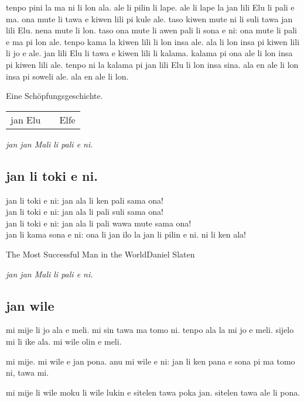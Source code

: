 tenpo pini la ma ni li lon ala. 
ale li pilin li lape. 
ale li lape la jan lili Elu li pali e ma. 
ona mute li tawa e kiwen lili pi kule ale. 
taso kiwen mute ni li suli tawa jan lili Elu. 
nena mute li lon.  
taso ona mute li awen pali li sona e ni: ona mute li pali e ma pi lon ale. 
tenpo kama la kiwen lili li lon insa ale. 
ala li lon insa pi kiwen lili li jo e ale. 
jan lili Elu li tawa e kiwen lili li kalama. 
kalama pi ona ale li lon insa pi kiwen lili ale.  
tenpo ni la kalama pi jan lili Elu li lon insa sina. 
ala en ale li lon insa pi soweli ale. 
ala en ale li lon.

Eine Sch\"opfungsgeschichte.

\begin{supertabular}{p{5,5cm}|ll}
jan Elu && Elfe \\
\end{supertabular}

\textit{jan jan Mali li pali e ni. \cite{www:astrodonunt:01}}

\subsection{jan li toki e ni.}

jan li toki e ni: jan ala li ken pali sama ona! \\
jan li toki e ni: jan ala li pali suli sama ona! \\
jan li toki e ni: jan ala li pali wawa mute sama ona! \\
jan li kama sona e ni: ona li jan ilo la jan li pilin e ni. ni li ken ala! 

\glqq The Most Successful Man in the World\grqq   Daniel Slaten

\textit{jan jan Mali li pali e ni. \cite{www:astrodonunt:01}}

\newpage
\subsection{jan wile}

mi mije li jo ala e meli. 
mi sin tawa ma tomo ni. 
tenpo ala la mi jo e meli. 
sijelo mi li ike ala. 
mi wile olin e meli.

mi mije. 
mi wile e jan pona. 
anu mi wile e ni: jan li ken pana e sona pi ma tomo ni, tawa mi.

mi mije li wile moku li wile lukin e sitelen tawa poka jan. 
sitelen tawa ale li pona.

